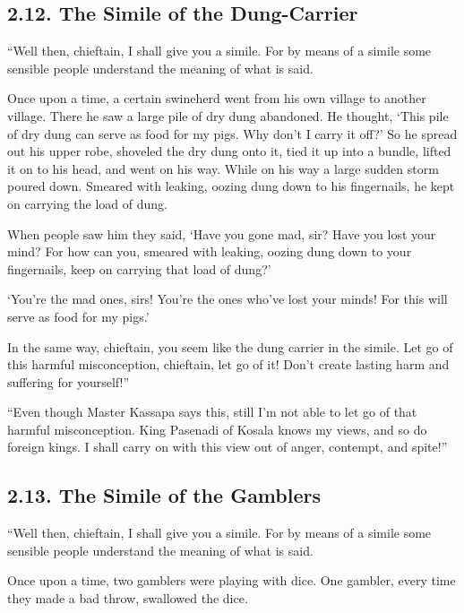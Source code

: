 \documentclass[12pt,openany]{book}%
\begin{document}
\subsection*{2.12. The Simile of the Dung-Carrier }

“Well then, chieftain, I shall give you a simile. For by means of a simile some sensible people understand the meaning of what is said. 

Once upon a time, a certain swineherd went from his own village to another village. There he saw a large pile of dry dung abandoned. He thought, ‘This pile of dry dung can serve as food for my pigs. Why don’t I carry it off?’ So he spread out his upper robe, shoveled the dry dung onto it, tied it up into a bundle, lifted it on to his head, and went on his way. While on his way a large sudden storm poured down. Smeared with leaking, oozing dung down to his fingernails, he kept on carrying the load of dung. 

When people saw him they said, ‘Have you gone mad, sir? Have you lost your mind? For how can you, smeared with leaking, oozing dung down to your fingernails, keep on carrying that load of dung?’ 

‘You’re the mad ones, sirs! You’re the ones who’ve lost your minds! For this will serve as food for my pigs.’ 

In the same way, chieftain, you seem like the dung carrier in the simile. Let go of this harmful misconception, chieftain, let go of it! Don’t create lasting harm and suffering for yourself!” 

“Even though Master Kassapa says this, still I’m not able to let go of that harmful misconception. King Pasenadi of Kosala knows my views, and so do foreign kings. I shall carry on with this view out of anger, contempt, and spite!” 

\subsection*{2.13. The Simile of the Gamblers }

“Well then, chieftain, I shall give you a simile. For by means of a simile some sensible people understand the meaning of what is said. 

Once upon a time, two gamblers were playing with dice. One gambler, every time they made a bad throw, swallowed the dice. 
\end{document}
